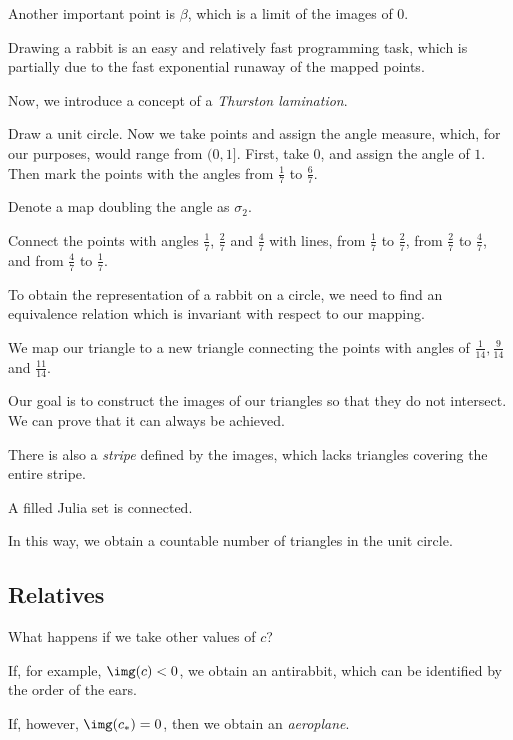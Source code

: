 \documentclass[11pt]{scrartcl}
\begin{document}
  Another important point is $\beta$, which is a limit of the images
  of $0$.

  Drawing a rabbit is an easy and relatively fast programming task,
  which is partially due to the fast exponential runaway of the mapped
  points.

  Now, we introduce a concept of a \textit{Thurston lamination}.

  Draw a unit circle. Now we take points and assign the angle measure,
  which, for our purposes, would range from $(0, 1]$. First, take $0$,
  and assign the angle of $1$. Then mark the points with the angles
  from $\frac{1}{7}$ to $\frac{6}{7}$.

  Denote a map doubling the angle as $\sigma_{2}$.

  Connect the points with angles $\frac{1}{7}$, $\frac{2}{7}$ and
  $\frac{4}{7}$ with lines, from $\frac{1}{7}$ to $\frac{2}{7}$, from
  $\frac{2}{7}$ to $\frac{4}{7}$, and from $\frac{4}{7}$ to
  $\frac{1}{7}$.

  To obtain the representation of a rabbit on a circle, we need to
  find an equivalence relation which is invariant with respect to our
  mapping.

  We map our triangle to a new triangle connecting the points with
  angles of $\frac{1}{14}, \frac{9}{14}$ and $\frac{11}{14}$.

  Our goal is to construct the images of our triangles so that they do
  not intersect. We can prove that it can always be achieved.

  There is also a \textit{stripe} defined by the images, which lacks
  triangles covering the entire stripe.

  \begin{note*}
    A filled Julia set is connected.
  \end{note*}

  In this way, we obtain a countable number of triangles in the unit
  circle.

  \subsection{Relatives}

  What happens if we take other values of $c$?

  If, for example, $\img(c) < 0$, we obtain an antirabbit, which can
  be identified by the order of the ears.

  If, however, $\img(c_{*}) = 0$, then we obtain an \textit{aeroplane}.
\end{document}
